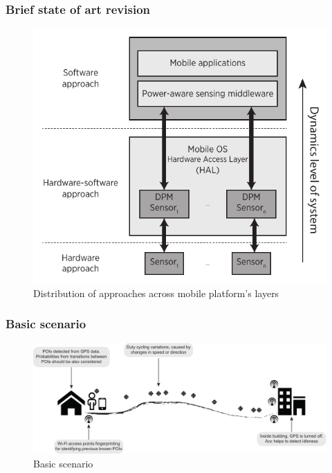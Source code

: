 \documentclass[compress,9pt,xcolor={dvipsnames,table}]{beamer}
\begin{document}
\begin{frame}\frametitle{Brief state of art revision}
\begin{figure}[tb]
  \centering
  \includegraphics[scale=0.72]{../../../resources/images/vectors/approaches-distribution}
  \caption{Distribution of approaches across mobile platform's layers}
  \label{fig:distribution}
\end{figure}
\end{frame}

\begin{frame}\frametitle{Basic scenario}
\begin{figure}[tb]
  \centering
  \includegraphics[width=\textwidth]{../../../resources/images/vectors/scenario}
  \caption{Basic scenario}
  \label{fig:scenario}
\end{figure}
\end{frame}
\end{document}
